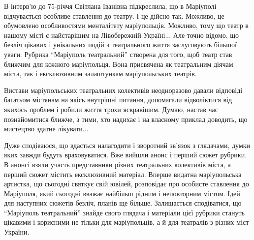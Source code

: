 В інтерв'ю до 75-річчя Світлана Іванівна підкреслила, що в Маріуполі
відчувається особливе ставлення до театру. І це дійсно так. Можливо, це
обумовлено особливостями менталітету маріупольців. Можливо, тому що театр в
нашому місті є найстарішим на Лівобережній Україні... Але точно відомо, що
безліч цікавих і унікальних подій з театрального життя заслуговують більшої
уваги. Рубрика \enquote{Маріуполь театральний} створена для того, щоб театр став
ближчим для кожного маріупольця. Вона присвячена як театральним діячам міста,
так і ексклюзивним залаштункам маріупольських театрів.

Вистави маріупольських театральних колективів неодноразово давали відповіді
багатьом містянам на якісь внутрішні питання, допомагали відволіктися від
якихось проблем і робили життя трохи яскравішим. Думаю, настав час
познайомитися ближче, з тими, хто надихає і на власному приклад доводить, що
мистецтво здатне лікувати...

Дуже сподіваюся, що вдасться налагодити і зворотний зв'язок з глядачами, думки
яких завжди будуть враховуватися. Вже вийшли анонс і перший сюжет рубрики. В
анонсі взяли участь представники різних театральних колективів міста, а перший
сюжет містить ексклюзивний матеріал. Вперше видатна маріупольська артистка, що
сьогодні святкує свій ювілей, розповідає про особисте ставлення до Маріуполя,
який сьогодні вважає найбільш рідним і неповторним містом. Ідей для наступних
сюжетів безліч, планів ще більше. Залишається сподіватися, що \enquote{Маріуполь
театральний} знайде свого глядача і матеріали цієї рубрики стануть цікавими і
корисними не тільки для маріупольців, а й для театралів з різних міст України.
